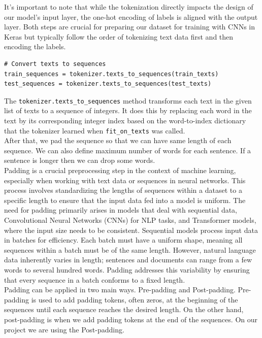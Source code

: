 It's important to note that while the tokenization directly impacts the design of our model's input layer, the one-hot encoding of labels is aligned with the output layer. Both steps are crucial for preparing our dataset for training with CNNs in Keras but typically follow the order of tokenizing text data first and then encoding the labels.\\

\begin{lstlisting}
# Convert texts to sequences
train_sequences = tokenizer.texts_to_sequences(train_texts)
test_sequences = tokenizer.texts_to_sequences(test_texts)
\end{lstlisting}

The \verb*|tokenizer.texts_to_sequences| method transforms each text in the given list of texts to a sequence of integers. It does this by replacing each word in the text by its corresponding integer index based on the word-to-index dictionary that the tokenizer learned when \verb*|fit_on_texts| was called.\\

After that, we pad the sequence so that we can have same length of each sequence. We can also define maximum number of words for each sentence. If a sentence is longer then we can drop some words. \\

Padding is a crucial preprocessing step in the context of machine learning, especially when working with text data or sequences in neural networks. This process involves standardizing the lengths of sequences within a dataset to a specific length to ensure that the input data fed into a model is uniform. The need for padding primarily arises in models that deal with sequential data, Convolutional Neural Networks (CNNs) for NLP tasks, and Transformer models, where the input size needs to be consistent.
Sequential models process input data in batches for efficiency. Each batch must have a uniform shape, meaning all sequences within a batch must be of the same length. However, natural language data inherently varies in length; sentences and documents can range from a few words to several hundred words. Padding addresses this variability by ensuring that every sequence in a batch conforms to a fixed length.\\

Padding can be applied in two main ways. Pre-padding and Post-padding. Pre-padding is used to add padding tokens, often zeros, at the beginning of the sequences until each sequence reaches the desired length. On the other hand, post-padding is when we add padding tokens at the end of the sequences. On our project we are using the Post-padding.\\

